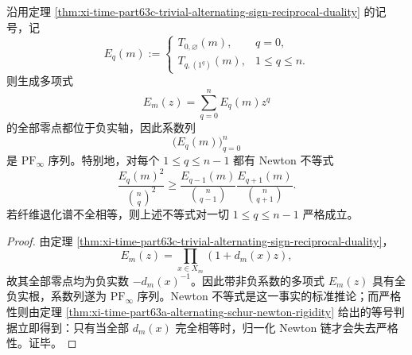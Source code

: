 \begin{corollary}\label{cor:xi-time-part63c-alternating-pf-infty-newton-rigidity}
沿用定理 \ref{thm:xi-time-part63c-trivial-alternating-sign-reciprocal-duality} 的记号，记
\[
E_q(m):=
\begin{cases}
T_{0,\varnothing}(m),& q=0,\\[2pt]
T_{q,(1^q)}(m),& 1\le q\le n.
\end{cases}
\]
则生成多项式
\[
E_m(z)=\sum_{q=0}^{n}E_q(m)z^q
\]
的全部零点都位于负实轴，因此系数列
\[
\bigl(E_q(m)\bigr)_{q=0}^{n}
\]
是 \(\mathrm{PF}_\infty\) 序列。特别地，对每个 \(1\le q\le n-1\) 都有 Newton 不等式
\[
\boxed{\;
\frac{E_q(m)^2}{\binom{n}{q}^2}
\ge
\frac{E_{q-1}(m)}{\binom{n}{q-1}}
\frac{E_{q+1}(m)}{\binom{n}{q+1}}.\;}
\]
若纤维退化谱不全相等，则上述不等式对一切 \(1\le q\le n-1\) 严格成立。
\end{corollary}
\begin{proof}
由定理 \ref{thm:xi-time-part63c-trivial-alternating-sign-reciprocal-duality}，
\[
E_m(z)=\prod_{x\in X_m}(1+d_m(x)z),
\]
故其全部零点均为负实数 \(-d_m(x)^{-1}\)。因此带非负系数的多项式 \(E_m(z)\) 具有全负实根，系数列遂为 \(\mathrm{PF}_\infty\) 序列。Newton 不等式是这一事实的标准推论；而严格性则由定理
\ref{thm:xi-time-part63a-alternating-schur-newton-rigidity}
给出的等号判据立即得到：只有当全部 \(d_m(x)\) 完全相等时，归一化 Newton 链才会失去严格性。证毕。
\end{proof}

